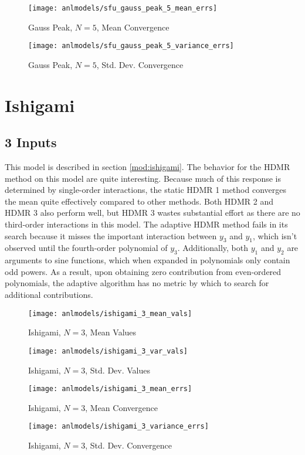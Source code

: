 \begin{figure}[H]
  \centering
  \texttt{[image: anlmodels/sfu\_gauss\_peak\_5\_mean\_errs]}
  \caption{Gauss Peak, $N=5$, Mean Convergence}
  \label{fig:hdmr gauss peak mean errors 5}
\end{figure}
\begin{figure}[H]
  \centering
  \texttt{[image: anlmodels/sfu\_gauss\_peak\_5\_variance\_errs]}
  \caption{Gauss Peak, $N=5$, Std. Dev. Convergence}
  \label{fig:hdmr gauss peak var errors 5}
\end{figure}




\section{Ishigami}
\subsection{3 Inputs}
This model is described in section \ref{mod:ishigami}.
The behavior for the HDMR method on this model are quite interesting.  Because much of this response is
determined by single-order interactions, the static HDMR 1 method converges the mean quite effectively
compared to other methods.  Both HDMR 2 and HDMR 3 also perform well, but HDMR 3 wastes substantial effort as
there are no third-order interactions in this model.  The adaptive HDMR method fails in its search because it
misses the important interaction between $y_3$ and $y_1$, which isn't observed until the fourth-order
polynomial of $y_3$.  Additionally, both $y_1$ and $y_2$ are arguments to sine functions, which when expanded
in polynomials only contain odd powers.  As a result, upon obtaining zero contribution from even-ordered
polynomials, the adaptive algorithm has no metric by which to search for additional contributions.
\begin{figure}[H]
  \centering
  \texttt{[image: anlmodels/ishigami\_3\_mean\_vals]}
  \caption{Ishigami, $N=3$, Mean Values}
  \label{fig:hdmr ishigami mean values 3}
\end{figure}
\begin{figure}[H]
  \centering
  \texttt{[image: anlmodels/ishigami\_3\_var\_vals]}
  \caption{Ishigami, $N=3$, Std. Dev. Values}
  \label{fig:hdmr ishigami var values 3}
\end{figure}

\begin{figure}[H]
  \centering
  \texttt{[image: anlmodels/ishigami\_3\_mean\_errs]}
  \caption{Ishigami, $N=3$, Mean Convergence}
  \label{fig:hdmr ishigami mean errors 3}
\end{figure}
\begin{figure}[H]
  \centering
  \texttt{[image: anlmodels/ishigami\_3\_variance\_errs]}
  \caption{Ishigami, $N=3$, Std. Dev. Convergence}
  \label{fig:hdmr ishigami var errors 3}
\end{figure}


